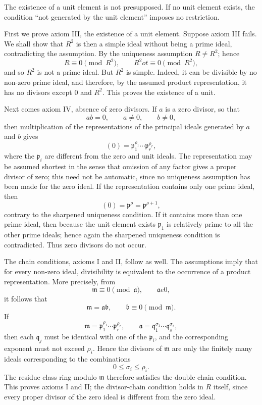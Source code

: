 \documentclass[
  12pt,
]{article}
\begin{document}
The existence of a unit element is not presupposed. If no unit element
exists, the condition ``not generated by the unit element'' imposes no
restriction.

First we prove axiom III, the existence of a unit element. Suppose axiom
III fails. We shall show that \(R^2\) is then a simple ideal without
being a prime ideal, contradicting the assumption. By the uniqueness
assumption \(R\ne R^2\); hence \[
  R\equiv0\pmod{R^2},
  \qquad R^2
ot\equiv0\pmod{R^2},
\] and so \(R^2\) is not a prime ideal. But \(R^2\) is simple. Indeed,
it can be divisible by no non-zero prime ideal, and therefore, by the
assumed product representation, it has no divisors except \(0\) and
\(R^2\). This proves the existence of a unit.

Next comes axiom IV, absence of zero divisors. If \(a\) is a zero
divisor, so that \[
  ab=0,
  \qquad a\ne0,
  \qquad b\ne0,
\] then multiplication of the representations of the principal ideals
generated by \(a\) and \(b\) gives \[
  (0)=\mathfrak p_1^{\rho_1}\cdots\mathfrak p_r^{\rho_r},
\] where the \(\mathfrak p_i\) are different from the zero and unit
ideals. The representation may be assumed shortest in the sense that
omission of any factor gives a proper divisor of zero; this need not be
automatic, since no uniqueness assumption has been made for the zero
ideal. If the representation contains only one prime ideal, then \[
  (0)=\mathfrak p^{\rho}=\mathfrak p^{\rho+1},
\] contrary to the sharpened uniqueness condition. If it contains more
than one prime ideal, then because the unit element exists
\(\mathfrak p_1\) is relatively prime to all the other prime ideals;
hence again the sharpened uniqueness condition is contradicted. Thus
zero divisors do not occur.

The chain conditions, axioms I and II, follow as well. The assumptions
imply that for every non-zero ideal, divisibility is equivalent to the
occurrence of a product representation. More precisely, from \[
  \mathfrak m\equiv0\pmod{\mathfrak a},
  \qquad \mathfrak a
e0,
\] it follows that \[
  \mathfrak m=\mathfrak a\mathfrak b,
  \qquad \mathfrak b\equiv0\pmod{\mathfrak m}.
\] If \[
  \mathfrak m=\mathfrak p_1^{\rho_1}\cdots\mathfrak p_r^{\rho_r},
  \qquad \mathfrak a=\mathfrak q_1^{\sigma_1}\cdots\mathfrak q_s^{\sigma_s},
\] then each \(\mathfrak q_j\) must be identical with one of the
\(\mathfrak p_i\), and the corresponding exponent must not exceed
\(\rho_i\). Hence the divisors of \(\mathfrak m\) are only the finitely
many ideals corresponding to the combinations \[
  0\le \sigma_i\le \rho_i.
\] The residue class ring modulo \(\mathfrak m\) therefore satisfies the
double chain condition. This proves axioms I and II; the divisor-chain
condition holds in \(R\) itself, since every proper divisor of the zero
ideal is different from the zero ideal.
\end{document}
